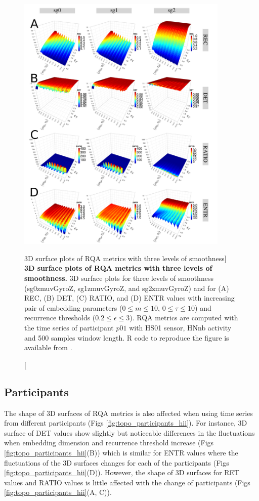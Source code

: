 \begin{figure}
\centering
\includegraphics[width=0.9\textwidth]{fig_5_21}
    \caption
	[3D surface plots of RQA metrics with three levels of smoothness]{
	{\bf 3D surface plots of RQA metrics with three levels of smoothness.}
	3D surface plots for 
	three levels of smoothness (sg0zmuvGyroZ, sg1zmuvGyroZ, and sg2zmuvGyroZ) 
	and for (A) REC, (B) DET, (C) RATIO, and (D) ENTR values 
	with increasing pair of embedding parameters 
	($0 \le m \le 10$, $0 \le \tau \le 10$) 
	and recurrence thresholds ($ 0.2 \le \epsilon \le 3 $).
	RQA metrics are computed with the time series of participant $p01$ with
	HS01 sensor, HNnb activity and 500 samples window length.
	R code to reproduce the figure is available from \cite{xochicale2018}.
 }
\label{fig:topo_smoothness_hii}
\end{figure}

\subsection{Participants}
The shape of 3D surfaces of RQA metrics is also affected when using 
time series from different participants (Figs \ref{fig:topo_participants_hii}).
For instance, 3D surface of DET values show slightly but noticeable 
differences in the fluctuations when embedding dimension and recurrence 
threshold increase (Figs \ref{fig:topo_participants_hii}(B)) which is similar 
for ENTR values where the fluctuations of the 3D surfaces changes for each 
of the participants (Figs \ref{fig:topo_participants_hii}(D)).
However, the shape of 3D surfaces for RET values and RATIO values 
is little affected with the change of participants 
(Figs \ref{fig:topo_participants_hii}(A, C)).


